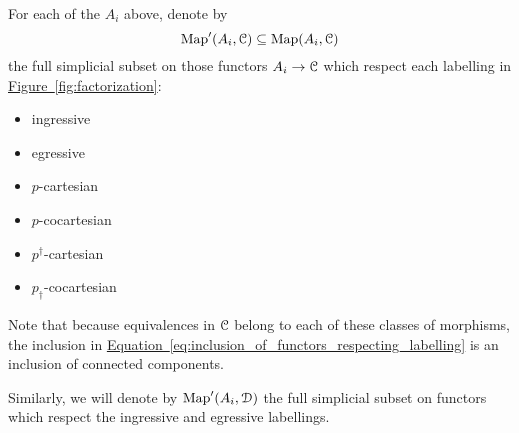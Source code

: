 \documentclass[main.tex]{subfiles}
\begin{document}
For each of the $A_{i}$ above, denote by
\begin{equation}
  \label{eq:inclusion_of_functors_respecting_labelling}
  \mathrm{Map}'(A_{i}, \mathcal{C}) \subseteq \mathrm{Map}(A_{i}, \mathcal{C})
\end{equation}
the full simplicial subset on those functors $A_{i} \to \mathcal{C}$ which respect each labelling in \hyperref[fig:factorization]{Figure~\ref*{fig:factorization}}:
\begin{itemize}
  \item ingressive
  \item egressive
  \item $p$-cartesian
  \item $p$-cocartesian
  \item $p^{\dagger}$-cartesian
  \item $p_{\dagger}$-cocartesian
\end{itemize}
Note that because equivalences in $\mathcal{C}$ belong to each of these classes of morphisms, the inclusion in \hyperref[eq:inclusion_of_functors_respecting_labelling]{Equation~\ref*{eq:inclusion_of_functors_respecting_labelling}} is an inclusion of connected components.

Similarly, we will denote by $\mathrm{Map}'(A_{i}, \mathcal{D})$ the full simplicial subset on functors which respect the ingressive and egressive labellings.
\end{document}
